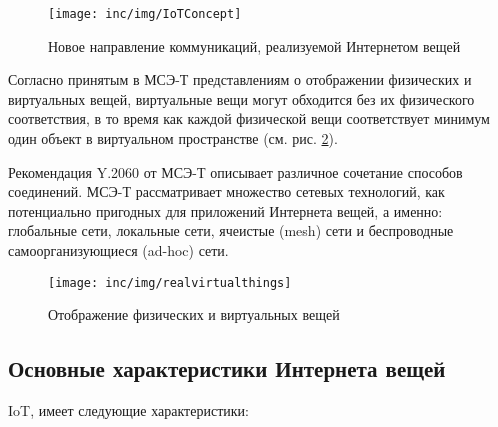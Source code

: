 \begin{figure}
  \centering
  \texttt{[image: inc/img/IoTConcept]}
	\caption{Новое направление коммуникаций, реализуемой Интернетом вещей\cite{itutiot2012}}
  \label{fig:iotconcept}
\end{figure}

Согласно принятым в МСЭ-Т представлениям о отображении физических и виртуальных вещей, виртуальные вещи могут обходится без их физического соответствия, в то время как каждой физической вещи соответствует минимум один объект в виртуальном пространстве (см. рис. \ref{fig:physvirtworld}).  

Рекомендация Y.2060 от МСЭ-Т описывает различное сочетание способов соединений.
МСЭ-Т рассматривает множество сетевых технологий, как потенциально пригодных для приложений Интернета вещей, а именно: глобальные сети, локальные сети, ячеистые (mesh) сети и беспроводные самоорганизующиеся (ad-hoc) сети.

\begin{figure}
  \centering
  \texttt{[image: inc/img/realvirtualthings]}
	\caption{Отображение физических и виртуальных вещей\cite{itutiot2012}}
  \label{fig:physvirtworld}
\end{figure}

\subsection{Основные характеристики Интернета вещей}

IoT, имеет следующие характеристики:

